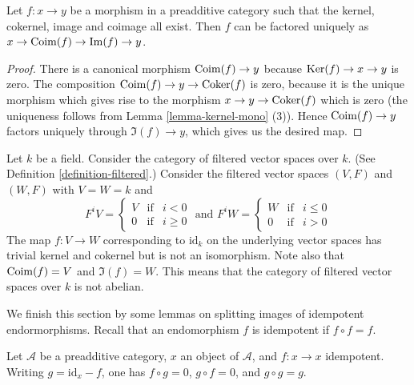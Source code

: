 \begin{lemma}
\label{lemma-coim-im-map}
Let $f : x \to y$ be a morphism in a preadditive category
such that the kernel, cokernel, image and coimage all exist.
Then $f$ can be factored uniquely as
$x \to \mathop{\mathrm{Coim}}(f) \to \mathop{\mathrm{Im}}(f) \to y$.
\end{lemma}

\begin{proof}
There is a canonical morphism $\mathop{\mathrm{Coim}}(f) \to y$
because $\mathop{\mathrm{Ker}}(f) \to x \to y$ is zero.
The composition $\mathop{\mathrm{Coim}}(f) \to y \to \mathop{\mathrm{Coker}}(f)$
is zero, because it is the unique morphism which gives
rise to the morphism $x \to y \to \mathop{\mathrm{Coker}}(f)$ which
is zero
(the uniqueness follows from
Lemma \ref{lemma-kernel-mono} (3)).
Hence $\mathop{\mathrm{Coim}}(f) \to y$ factors uniquely through
$\Im(f) \to y$, which gives us the desired map.
\end{proof}

\begin{example}
\label{example-not-abelian}
Let $k$ be a field.
Consider the category
of filtered vector spaces over $k$.
(See Definition \ref{definition-filtered}.)
Consider the filtered vector spaces $(V, F)$ and $(W, F)$ with
$V = W = k$ and
$$
F^iV
=
\left\{
\begin{matrix}
V & \text{if} & i < 0 \\
0 & \text{if} & i \geq 0
\end{matrix}
\right.
\text{ and }
F^iW
=
\left\{
\begin{matrix}
W & \text{if} & i \leq 0 \\
0 & \text{if} & i > 0
\end{matrix}
\right.
$$
The map $f : V \to W$ corresponding to $\text{id}_k$ on the underlying
vector spaces has trivial kernel and cokernel but is not
an isomorphism. Note also that $\mathop{\mathrm{Coim}}(f) = V$ and $\Im(f) = W$.
This means that the category of filtered vector spaces over $k$
is not abelian.
\end{example}

\noindent
We finish this section by some lemmas on splitting images of
idempotent endormorphisms. Recall that an endomorphism $f$
is idempotent if $f \circ f = f$.

\begin{remark}
\label{remark-idempotent-symmetry}
Let $\mathcal{A}$ be a preadditive category,
$x$ an object of $\mathcal{A}$,
and $f : x \to x$ idempotent.
Writing $g = \text{id} _ x - f$,
one has $f \circ g = 0$, $g \circ f = 0$, and $g \circ g = g$.
\end{remark}

